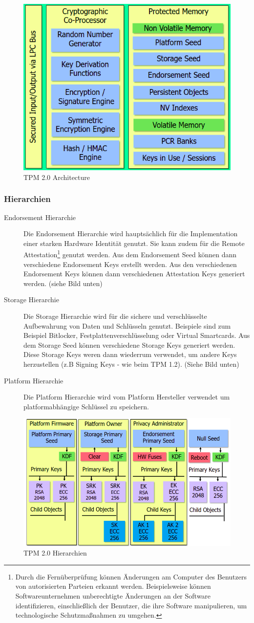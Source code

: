 \begin{figure}[h]
	\centering
	\includegraphics[width=0.45\linewidth]{images/tpm_2.png}
	\caption{TPM 2.0 Architecture}
	\label{fig:tpm20architecture}
\end{figure}

\subsubsection{Hierarchien}
\begin{description}
    \item[Endorsement Hierarchie] Die Endorsement Hierarchie wird hauptsächlich für die Implementation einer starken Hardware Identität genutzt. Sie kann zudem für die Remote Attestation\footnote{Durch die Fernüberprüfung können Änderungen am Computer des Benutzers von autorisierten Parteien erkannt werden. Beispielsweise können Softwareunternehmen unberechtigte Änderungen an der Software identifizieren, einschließlich der Benutzer, die ihre Software manipulieren, um technologische Schutzmaßnahmen zu umgehen.} genutzt werden. Aus dem Endorsement Seed können dann verschiedene Endorsement Keys erstellt werden. Aus den verschiedenen Endorsement Keys können dann verschiedenen Attestation Keys generiert werden. (siehe Bild unten)
    \item[Storage Hierarchie] Die Storage Hierarchie wird für die sichere und verschlüsselte Aufbewahrung von Daten und Schlüsseln genutzt. Beispiele sind zum Beispiel Bitlocker, Festplattenverschlüsselung oder Virtual Smartcards. Aus dem Storage Seed können verschiedene Storage Keys generiert werden. Diese Storage Keys weren dann wiederrum verwendet, um andere Keys herzustellen (z.B Signing Keys - wie beim TPM 1.2). (Siehe Bild unten)
    \item[Platform Hierarchie] Die Platform Hierarchie wird vom Platform Hersteller verwendet um platformabhängige Schlüssel zu speichern.
\end{description}

\begin{figure}[h]
	\centering
	\includegraphics[width=0.45\linewidth]{images/tpm2-hierarchie.png}
	\caption{TPM 2.0 Hierarchien}
	\label{fig:tpm20architecture}
\end{figure}

